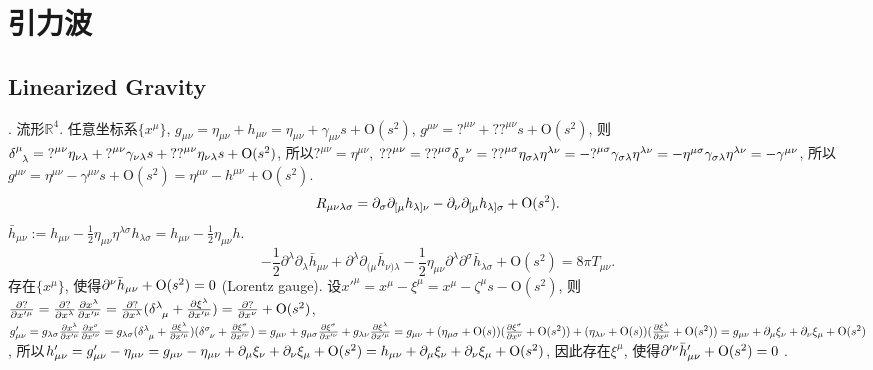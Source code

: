 \chapter{引力波}

\section{Linearized Gravity}

\cite{Wald1984}. 流形$\mathbb{R}^{4}$. 任意坐标系$\{x^{\mu}\}$, $g_{\mu\nu}=\eta_{\mu\nu}+h_{\mu\nu}=\eta_{\mu\nu}+\gamma_{\mu\nu}s+\text{O}(s^2)$, $g^{\mu\nu}={?}^{\mu\nu}+{??}^{\mu\nu}s+\text{O}(s^2)$, 则$\delta^{\mu}_{\ph{\mu}\lambda}={?}^{\mu\nu}\eta_{\nu\lambda}+{?}^{\mu\nu}\gamma_{\nu\lambda}s+{??}^{\mu\nu}\eta_{\nu\lambda}s+\text{O}(s^2)$, 所以${?}^{\mu\nu}=\eta^{\mu\nu}$, ${??}^{\mu\nu}={??}^{\mu\sigma}\delta_{\sigma}^{\ph{\sigma}\nu}={??}^{\mu\sigma}\eta_{\sigma\lambda}\eta^{\lambda\nu}=-{?}^{\mu\sigma}\gamma_{\sigma\lambda}\eta^{\lambda\nu}=-\eta^{\mu\sigma}\gamma_{\sigma\lambda}\eta^{\lambda\nu}=-\gamma^{\mu\nu}$, 所以$g^{\mu\nu}=\eta^{\mu\nu}-\gamma^{\mu\nu}s+\text{O}(s^2)=\eta^{\mu\nu}-h^{\mu\nu}+\text{O}(s^2)$.
\begin{equation}
    R_{\mu\nu\lambda\sigma}=\partial_\sigma\partial_{[\mu}h_{\lambda]\nu}-\partial_\nu\partial_{[\mu}h_{\lambda]\sigma}+\text{O}(s^2).
\end{equation}
$\bar{h}_{\mu\nu}:=h_{\mu\nu}-\frac{1}{2}\eta_{\mu\nu}\eta^{\lambda\sigma}h_{\lambda\sigma}=h_{\mu\nu}-\frac{1}{2}\eta_{\mu\nu}h$.
\begin{equation}
    -\frac{1}{2} \partial^{\lambda} \partial_{\lambda} \bar{h}_{\mu \nu}+\partial^{\lambda} \partial_{(\mu} \bar{h}_{\nu) \lambda}-\frac{1}{2} \eta_{\mu \nu} \partial^{\lambda} \partial^{\sigma} \bar{h}_{\lambda \sigma}+\text{O}(s^2)=8 \pi T_{\mu \nu}.
\end{equation}
存在$\{x^{\mu}\}$, 使得$\partial^{\nu}\bar{h}_{\mu\nu}+\text{O}(s^2)=0$ (Lorentz gauge). 设$x'^\mu=x^\mu-\xi^\mu=x^\mu-\zeta^\mu s-\text{O}(s^2)$, 则$\frac{\p ?}{\p x'^\mu}=\frac{\p ?}{\p x^\lambda}\frac{\p x^\lambda}{\p x'^\mu}=\frac{\p ?}{\p x^\lambda}(\delta^{\lambda}_{\ph{\lambda}\mu}+\frac{\p \xi^\lambda}{\p x'^\mu})=\frac{\p ?}{\p x^\nu}+\text{O}(s^2)$, $g'_{\mu\nu}=g_{\lambda\sigma}\frac{\p x^\lambda}{\p x'^\mu}\frac{\p x^\sigma}{\p x'^\nu}=g_{\lambda\sigma}(\delta^{\lambda}_{\ph{\lambda}\mu}+\frac{\p \xi^\lambda}{\p x'^\mu})(\delta^{\sigma}_{\ph{\sigma}\nu}+\frac{\p \xi^\sigma}{\p x'^\nu})=g_{\mu\nu}+g_{\mu\sigma}\frac{\p \xi^\sigma}{\p x'^\nu}+g_{\lambda\nu}\frac{\p \xi^\lambda}{\p x'^\mu}=g_{\mu\nu}+(\eta_{\mu\sigma}+\text{O}(s))(\frac{\p \xi^\sigma}{\p x^\nu}+\text{O}(s^2))+(\eta_{\lambda\nu}+\text{O}(s))(\frac{\p \xi^\lambda}{\p x^\mu}+\text{O}(s^2))=g_{\mu\nu}+\p_\mu\xi_\nu+\p_\nu\xi_\mu+\text{O}(s^2)$, 所以$h'_{\mu\nu}=g'_{\mu\nu}-\eta_{\mu\nu}=g_{\mu\nu}-\eta_{\mu\nu}+\partial_\mu\xi_\nu+\partial_\nu\xi_\mu+\text{O}(s^2)=h_{\mu\nu}+\partial_\mu\xi_\nu+\partial_\nu\xi_\mu+\text{O}(s^2)$, 因此存在$\xi^\mu$, 使得$\partial'^{\nu}\bar{h}'_{\mu\nu}+\text{O}(s^2)=0$ \cite{Wald1984}.

